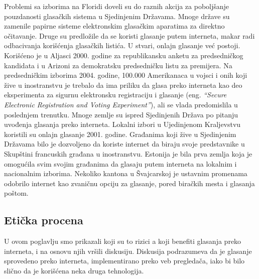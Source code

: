 \documentclass[a4paper]{article}
\begin{document}
Problemi sa izborima na Floridi doveli su do raznih akcija za poboljšanje pouzdanosti glasačkih sistema u Sjedinjenim Državama. Mnoge države su zamenile papirne sisteme elektronskim glasačkim aparatima za direktno očitavanje. Druge su predložile da se koristi glasanje putem interneta, makar radi odbacivanja korišćenja glasačkih listića. U stvari, onlajn glasanje već postoji. Korišćeno je u Aljasci 2000. godine za republikansku anketu za predsedničkog kandidata i u Arizoni za demokratsku predsedničku listu za  premijera. Na predsedničkim izborima 2004. godine, 100.000 Amerikanaca u vojsci i onih koji žive u inostranstvu je trebalo da ima priliku da glasa preko interneta kao deo eksperimenta za sigurnu elektronsku registraciju i glasanje (eng. {\em “Secure Electronic Registration and Voting Experiment”}), ali se vlada predomislila u poslednjem trenutku.
Mnoge zemlje su ispred Sjedinjenih Država po pitanju uvođenja glasanja preko interneta. Lokalni izbori u Ujedinjenom Kraljevstvu koristili su onlajn glasanje 2001. godine. Građanima koji žive u Sjedinjenim Državama bilo je dozvoljeno da koriste internet da biraju svoje predstavnike u Skupštini francuskih građana u inostranstvu. Estonija je bila prva zemlja koja je omogućila svim svojim građanima da glasaju putem interneta na lokalnim i nacionalnim izborima. Nekoliko kantona u Švajcarskoj je ustavnim promenama odobrilo internet kao zvaničnu opciju za glasanje, pored biračkih mesta i glasanja poštom.

\subsection{Etička procena}
\label{subsec:Eticka procena}

U ovom poglavlju smo prikazali koji su to rizici a koji benefiti glasanja preko interneta, i na osnovu njih vršili diskusiju. Diskusija podrazumeva da je glasanje sprovedeno preko interneta, implementirano preko veb pregledača, iako bi bilo slično da je korišćena neka druga tehnologija.\\
\end{document}
